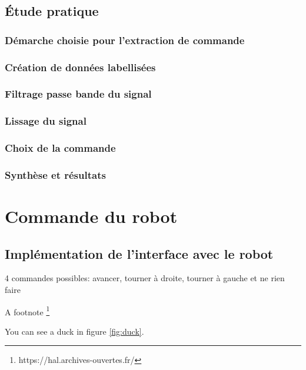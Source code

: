 \documentclass[11pt]{article}
\begin{document}
\cleardoublepage

\subsection{Étude pratique}
\subsubsection{Démarche choisie pour l'extraction de commande}
\subsubsection{Création de données labellisées}
\subsubsection{Filtrage passe bande du signal}
\subsubsection{Lissage du signal}
\subsubsection{Choix de la commande}
\subsubsection{Synthèse et résultats}

\cleardoublepage


\section{Commande du robot}

 	  
\subsection{Implémentation de l'interface avec le robot}
4 commandes possibles: avancer, tourner à droite, tourner à gauche et ne rien faire

A footnote \footnote{https://hal.archives-ouvertes.fr/}

You can see a duck in figure \ref{fig:duck}.
\end{document}
